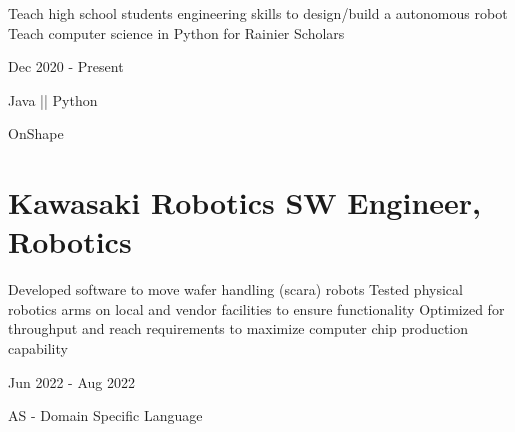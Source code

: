 \vspace{-2.0ex}
\begin{detail}
    \BulletItem
    Teach high school students engineering skills to design/build a autonomous robot
    \BulletItem
    Teach computer science in Python for Rainier Scholars
\end{detail}

\begin{subtitle}
    \vspace{-8ex}
    {{Dec 2020 - Present}}
\end{subtitle}

{\vspace{0.5ex} \color{cyan} \small {Java || Python}}

{\vspace{-2.5ex} \hspace{3.17in} \color{cyan} \small {OnShape} }
\vspace{2.5ex}


\section
{\textbf{Kawasaki Robotics} \newline
SW Engineer, Robotics}{}

\vspace{-2.0ex}
\begin{detail}
    \BulletItem
    Developed software to move wafer handling (scara) robots 
    \BulletItem
    Tested physical robotics arms on local and vendor facilities to ensure functionality
    \BulletItem
    Optimized for throughput and reach requirements to maximize computer chip production capability
\end{detail}

\begin{subtitle}
    \vspace{-10.5ex}
    {{Jun 2022 - Aug 2022}}
\end{subtitle}

{\vspace{2.5ex} \color{cyan}\small {AS - Domain Specific Language}}
\vspace{2.5ex}


